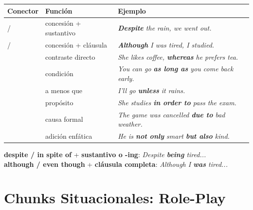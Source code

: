 \documentclass[12pt,a4paper]{article}
\begin{document}
\begin{cajachunk}
\begin{tabularx}{\textwidth}{@{} l l X @{}}
\toprule
\textbf{Conector} & \textbf{Función} & \textbf{Ejemplo} \\
\midrule
\eng{despite} / \eng{in spite of} & concesión + sustantivo & \textit{\textbf{Despite} the rain, we went out.} \\
\eng{although} / \eng{even though} & concesión + cláusula & \textit{\textbf{Although} I was tired, I studied.} \\
\eng{whereas} & contraste directo & \textit{She likes coffee, \textbf{whereas} he prefers tea.} \\
\eng{as long as} & condición & \textit{You can go \textbf{as long as} you come back early.} \\
\eng{unless} & a menos que & \textit{I'll go \textbf{unless} it rains.} \\
\eng{in order to} & propósito & \textit{She studies \textbf{in order to} pass the exam.} \\
\eng{due to} & causa formal & \textit{The game was cancelled \textbf{due to} bad weather.} \\
\eng{not only ... but also} & adición enfática & \textit{He is \textbf{not only} smart \textbf{but also} kind.} \\
\bottomrule
\end{tabularx}

\medskip
\begin{cajaejemplo}
\textbf{despite / in spite of} + \textbf{sustantivo o -ing}: \textit{Despite \textbf{being} tired...}\\
\textbf{although / even though} + \textbf{cláusula completa}: \textit{Although I \textbf{was} tired...}
\end{cajaejemplo}
\end{cajachunk}

\section{Chunks Situacionales: Role-Play}
\end{document}
